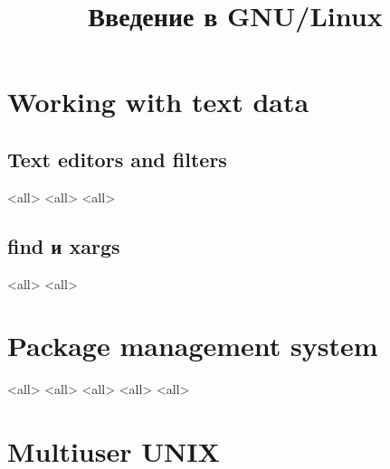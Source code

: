 

\title{Введение в GNU/Linux}








\begin{frame}
	\frametitle{}
	\titlepage
	\vspace{-0.5cm}
	\begin{center}
	\end{center}
\end{frame}





\section{Working with text data}

\subsection{Text editors and filters}
\mode<all>{}
\mode<all>{} %
\mode<all>{} %
\subsection{find и xargs}
\mode<all>{}
\mode<all>{}

\section{Package management system}
\mode<all>{}
\mode<all>{}
\mode<all>{}
\mode<all>{}
\mode<all>{}


\section{Multiuser UNIX}
